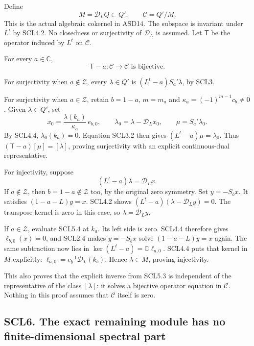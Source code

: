Define \[
 M=\mathcal D_LQ\subset Q',\qquad
 \mathscr C=Q'/M.
 \tag{SCL5.1}
\] This is the actual algebraic cokernel in ASD14. The subspace is
invariant under \(L^t\) by SCL4.2. No closedness or surjectivity of
\(\mathcal D_L\) is assumed. Let \(\mathsf T\) be the operator induced
by \(L^t\) on \(\mathscr C\).

For every \(a\in\mathbb C\), \[
 \boxed{\mathsf T-a:\mathscr C\longrightarrow\mathscr C
       \text{ is bijective}.}
 \tag{SCL5.2}
\]

For surjectivity when \(a\notin\mathscr Z\), every \(\lambda\in Q'\) is
\((L^t-a)S_a'\lambda\), by SCL3.

For surjectivity when \(a\in\mathscr Z\), retain \(b=1-a\), \(m=m_a\)
and \(\kappa_a=(-1)^{m-1}c_b\ne0\). Given \(\lambda\in Q'\), set \[
 x_0=\frac{\lambda(k_a)}{\kappa_a}\,e_{b,0},\qquad
 \lambda_0=\lambda-\mathcal D_Lx_0,\qquad
 \mu=S_a'\lambda_0.
 \tag{SCL5.3}
\] By SCL4.4, \(\lambda_0(k_a)=0\). Equation SCL3.2 then gives
\((L^t-a)\mu=\lambda_0\). Thus \((\mathsf T-a)[\mu]=[\lambda]\), proving
surjectivity with an explicit continuous-dual representative.

For injectivity, suppose \[
 (L^t-a)\lambda=\mathcal D_Lx.
 \tag{SCL5.4}
\] If \(a\notin\mathscr Z\), then \(b=1-a\notin\mathscr Z\) too, by the
original zero symmetry. Set \(y=-S_bx\). It satisfies \((1-a-L)y=x\).
SCL4.2 shows \((L^t-a)(\lambda-\mathcal D_Ly)=0\). The transpose kernel
is zero in this case, so \(\lambda=\mathcal D_Ly\).

If \(a\in\mathscr Z\), evaluate SCL5.4 at \(k_a\). Its left side is
zero. SCL4.4 therefore gives \(\ell_{b,0}(x)=0\), and SCL2.4 makes
\(y=-S_bx\) solve \((1-a-L)y=x\) again. The same subtraction now lies in
\(\ker(L^t-a)=\mathbb C\ell_{a,0}\). SCL4.4 puts that kernel in \(M\)
explicitly: \(\ell_{a,0}=c_b^{-1}\mathcal D_L(k_b)\). Hence
\(\lambda\in M\), proving injectivity.

This also proves that the explicit inverse from SCL5.3 is independent of
the representative of the class \([\lambda]\): it solves a bijective
operator equation in \(\mathscr C\). Nothing in this proof assumes that
\(\mathscr C\) itself is zero.

\subsection{SCL6. The exact remaining module has no finite-dimensional
spectral
part}\label{scl6.-the-exact-remaining-module-has-no-finite-dimensional-spectral-part}

